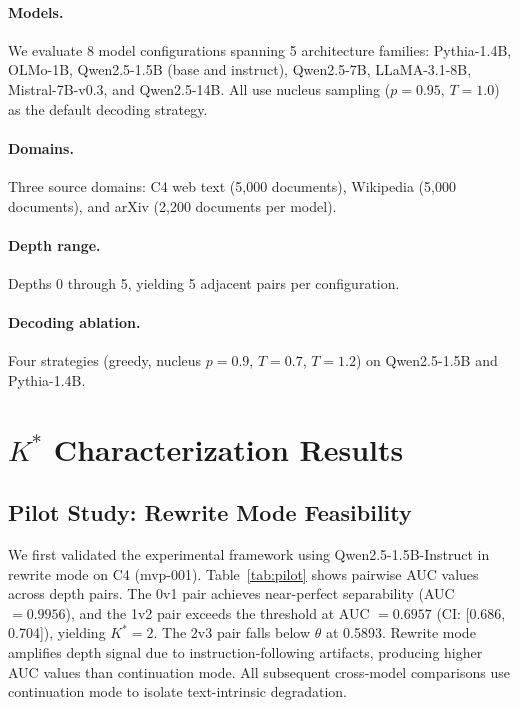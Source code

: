 \documentclass[11pt]{article}
\begin{document}
\paragraph{Models.} We evaluate 8 model configurations spanning 5 architecture families: Pythia-1.4B, OLMo-1B, Qwen2.5-1.5B (base and instruct), Qwen2.5-7B, LLaMA-3.1-8B, Mistral-7B-v0.3, and Qwen2.5-14B. All use nucleus sampling ($p=0.95$, $T=1.0$) as the default decoding strategy.

\paragraph{Domains.} Three source domains: C4 web text (5,000 documents), Wikipedia (5,000 documents), and arXiv (2,200 documents per model).

\paragraph{Depth range.} Depths 0 through 5, yielding 5 adjacent pairs per configuration.

\paragraph{Decoding ablation.} Four strategies (greedy, nucleus $p{=}0.9$, $T{=}0.7$, $T{=}1.2$) on Qwen2.5-1.5B and Pythia-1.4B.

\section{$K^*$ Characterization Results}
\label{sec:characterization}

\subsection{Pilot Study: Rewrite Mode Feasibility}

We first validated the experimental framework using Qwen2.5-1.5B-Instruct in rewrite mode on C4 (mvp-001). Table~\ref{tab:pilot} shows pairwise AUC values across depth pairs. The 0v1 pair achieves near-perfect separability (AUC $= 0.9956$), and the 1v2 pair exceeds the threshold at AUC $= 0.6957$ (CI: [0.686, 0.704]), yielding $K^* = 2$. The 2v3 pair falls below $\theta$ at 0.5893. Rewrite mode amplifies depth signal due to instruction-following artifacts, producing higher AUC values than continuation mode. All subsequent cross-model comparisons use continuation mode to isolate text-intrinsic degradation.
\end{document}
